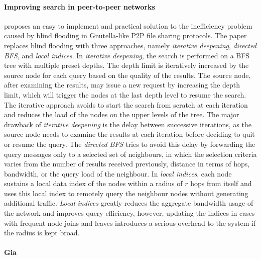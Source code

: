 \documentclass[acmcsur,acmnow]{acmtrans2m}
\begin{document}

\paragraph*{\bf Improving search in peer-to-peer networks}

\cite{yang_improvep2psearch_2002} proposes an easy to implement and practical
solution to the inefficiency problem caused by blind flooding in Gnutella-like
P2P file sharing protocols. The paper replaces blind flooding with three
approaches, namely \textit{iterative deepening}, \textit{directed BFS}, and
\textit{local indices}. In \textit{iterative deepening}, the search is performed
on a BFS tree with multiple preset depths. The depth limit is iteratively
increased by the source node for each query based on the quality of the results.
The source node, after examining the results, may issue a new request by
increasing the depth limit, which will trigger the nodes at the last depth
level to resume the search. The iterative approach avoids to start the search
from scratch at each iteration and reduces the load of the nodes on the upper
levels of the tree. The major drawback of \textit{iterative deepening} is the
delay between successive iterations, as the source node needs to examine the
results at each iteration before deciding to quit or resume the query.  The
\textit{directed BFS} tries to avoid this delay by forwarding the query messages
only to a selected set of neighbours, in which the selection criteria varies
from the number of results received previously, distance in terms of hops,
bandwidth, or the query load of the neighbour. In \textit{local indices}, each
node sustains a local data index of the nodes within a radius of $r$ hops from
itself and uses this local index to remotely query the neighbour nodes without
generating additional traffic.  \textit{Local indices} greatly reduces the
aggregate bandwidth usage of the network and improves query efficiency, however,
updating the indices in cases with frequent node joins and leaves introduces a
serious overhead to the system if the radius is kept broad.

\paragraph*{\bf Gia}
\end{document}
